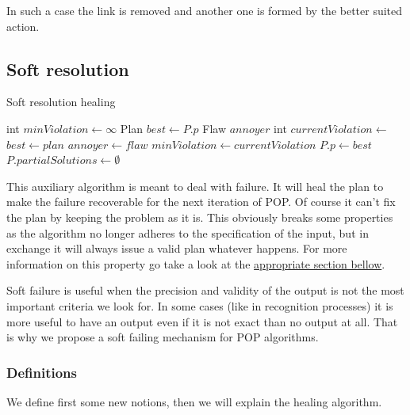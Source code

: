 \documentclass[]{article}
\begin{document}
In such a case the link is removed and another one is formed by the
better suited action.

\subsection{Soft resolution}\label{soft-resolution}

\begin{algorithm}\caption{Soft resolution healing}\label{softresolution}\begin{algorithmic}[1]

 \State int \(minViolation \gets \infty\)
\State Plan \(best \gets P.p\) \State Flaw \(annoyer\)
 \State int
\(currentViolation \gets\) 
 \State \(best \gets plan\)
\State \(annoyer \gets flaw\)
\State \(minViolation \gets currentViolation\) \EndIf
    \EndFor
    \State \(P.p \gets best\)
\State \(P.partialSolutions \gets \emptyset\)
\State {} \EndFor
\EndFunction

\end{algorithmic}\end{algorithm}

This auxiliary algorithm is meant to deal with failure. It will heal the
plan to make the failure recoverable for the next iteration of POP. Of
course it can't fix the plan by keeping the problem as it is. This
obviously breaks some properties as the algorithm no longer adheres to
the specification of the input, but in exchange it will always issue a
valid plan whatever happens. For more information on this property go
take a look at the \protect\hyperlink{hypersoundness}{appropriate
section bellow}.

Soft failure is useful when the precision and validity of the output is
not the most important criteria we look for. In some cases (like in
recognition processes) it is more useful to have an output even if it is
not exact than no output at all. That is why we propose a soft failing
mechanism for POP algorithms.

\subsubsection{Definitions}\label{definitions-1}

We define first some new notions, then we will explain the healing
algorithm.
\end{document}
